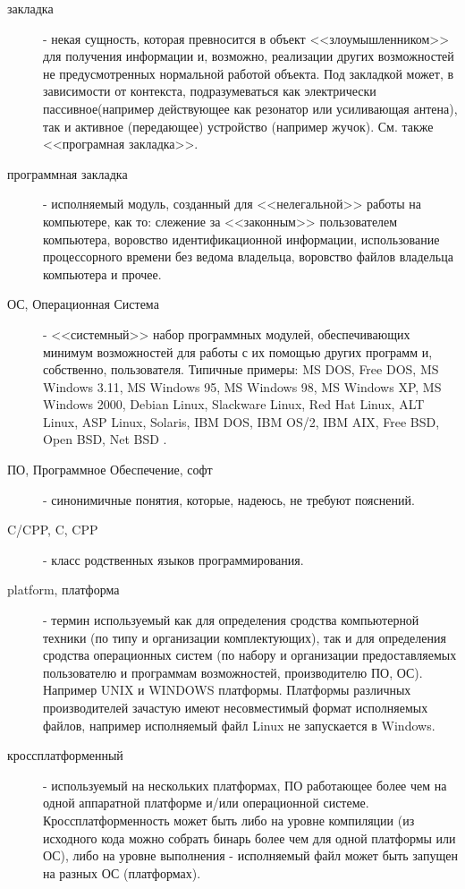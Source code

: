 \begin{description}
\item[закладка]
 - некая сущность, которая превносится в объект <<злоумышленником>>
 для получения информации и, возможно, реализации других возможностей не
предусмотренных нормальной работой объекта. Под закладкой может, в зависимости от контекста,
подразумеваться как электрически пассивное(например действующее как резонатор или усиливающая
антена), так и активное (передающее) устройство (например жучок).
См. также <<програмная закладка>>.


\item[программная закладка]
 - исполняемый модуль, созданный для <<нелегальной>>
работы на компьютере, как то: слежение за <<законным>> пользователем
компьютера, воровство идентификационной информации, использование
процессорного времени без ведома владельца, воровство файлов владельца
компьютера и прочее.

\item[ОС, Операционная Система]
 - <<системный>> набор программных модулей, обеспечивающих минимум возможностей для работы с
их помощью других программ и, собственно, пользователя.
Типичные примеры: MS DOS, Free DOS, MS Windows 3.11, MS Windows 95, MS Windows 98, MS Windows XP,
MS  Windows 2000, Debian Linux, Slackware Linux, Red Hat Linux, ALT Linux, ASP Linux, Solaris, IBM DOS,
IBM OS/2, IBM AIX, Free BSD, Open BSD, Net BSD .

\item[ПО, Программное Обеспечение, софт ]
 - синонимичные понятия, которые, надеюсь,
не требуют пояснений.

\item[C/CPP, C, CPP]
 - класс родственных языков программирования.

\item[platform, платформа]
 - термин используемый как для определения сродства компьютерной
техники (по типу и организации комплектующих), так и для определения сродства
операционных систем (по набору и организации предоставляемых пользователю и
программам возможностей, производителю ПО, ОС). Например UNIX и WINDOWS
платформы. Платформы различных производителей зачастую имеют несовместимый
формат исполняемых файлов, например исполняемый файл Linux не запускается в
Windows.

\item[кроссплатформенный]
 - используемый на нескольких платформах, ПО работающее более чем на одной аппаратной
 платформе и/или операционной системе. Кроссплатформенность может быть либо на уровне
 компиляции (из исходного кода можно собрать бинарь более чем для одной платформы или ОС),
 либо на уровне выполнения - исполняемый файл может быть запущен на разных ОС (платформах).


\end{description}
